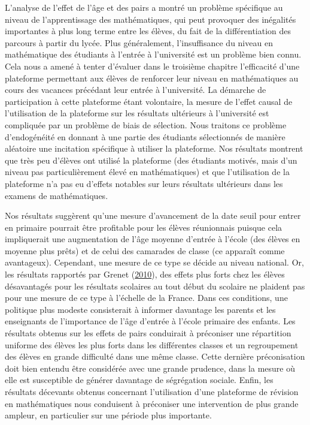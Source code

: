\documentclass[
]{book}
\begin{document}
\quad L'analyse de l'effet de l'âge et des pairs a montré un problème spécifique au niveau de l'apprentissage des mathématiques, qui peut provoquer des inégalités importantes à plus long terme entre les élèves, du fait de la différentiation des parcours à partir du lycée. Plus généralement, l'insuffisance du niveau en mathématique des étudiants à l'entrée à l'université est un problème bien connu. Cela nous a amené à tenter d'évaluer dans le troisième chapitre l'efficacité d'une plateforme permettant aux élèves de renforcer leur niveau en mathématiques au cours des vacances précédant leur entrée à l'université. La démarche de participation à cette plateforme étant volontaire, la mesure de l'effet causal de l'utilisation de la plateforme sur les résultats ultérieurs à l'université est compliquée par un problème de biais de sélection. Nous traitons ce problème d'endogénéité en donnant à une partie des étudiants sélectionnés de manière aléatoire une incitation spécifique à utiliser la plateforme. Nos résultats montrent que très peu d'élèves ont utilisé la plateforme (des étudiants motivés, mais d'un niveau pas particulièrement élevé en mathématiques) et que l'utilisation de la plateforme n'a pas eu d'effets notables sur leurs résultats ultérieurs dans les examens de mathématiques.

Nos résultats suggèrent qu'une mesure d'avancement de la date seuil pour entrer en primaire pourrait être profitable pour les élèves réunionnais puisque cela impliquerait une augmentation de l'âge moyenne d'entrée à l'école (des élèves en moyenne plus prêts) et de celui des camarades de classe (ce apparaît comme avantageux). Cependant, une mesure de ce type se décide au niveau national. Or, les résultats rapportés par Grenet (\protect\hyperlink{ref-GRE:10}{2010}), des effets plus forts chez les élèves désavantagés pour les résultats scolaires au tout début du scolaire ne plaident pas pour une mesure de ce type à l'échelle de la France. Dans ces conditions, une politique plus modeste consisterait à informer
davantage les parents et les enseignants de l'importance de l'âge d'entrée à l'école primaire des enfants. Les résultats obtenus sur les effets de pairs conduirait à préconiser une répartition uniforme des élèves les plus forts dans les différentes classes et un regroupement des élèves en grande difficulté dans une même classe. Cette dernière préconisation doit bien entendu être considérée avec une grande prudence, dans la mesure où elle est susceptible de générer davantage de ségrégation sociale. Enfin, les résultats décevants obtenus concernant l'utilisation d'une plateforme de révision en mathématiques nous conduisent à préconiser une intervention de plus grande ampleur, en particulier sur une période plus importante.
\end{document}
